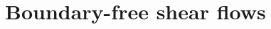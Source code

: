 \documentclass{article}
\begin{document}
\title{}
\author{}
\date{}
\fi

\section{Boundary-free shear flows}




\ifx\allfiles\undefined         %
\end{document}
